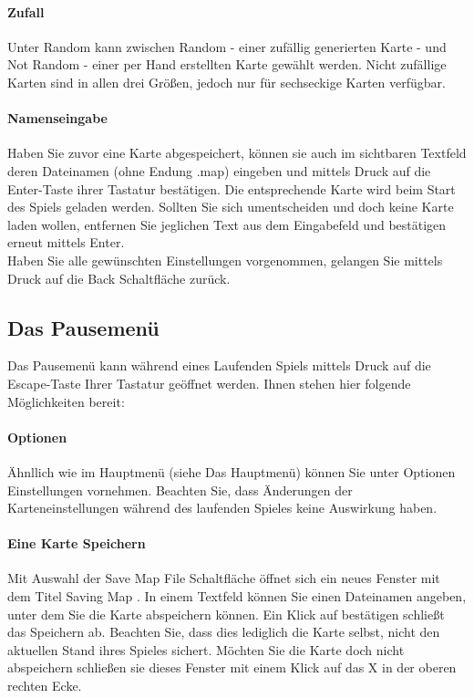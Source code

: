 \documentclass[a4paper,12pt]{scrartcl}
\begin{document}
	\paragraph{Zufall}
	Unter \glqq Random\grqq\hspace{0.05em} kann zwischen \glqq Random\grqq\hspace{0.05em}  - einer zufällig generierten Karte - und \glqq Not Random\grqq\hspace{0.05em}  - einer per Hand erstellten Karte gewählt werden.
	Nicht zufällige Karten sind in allen drei Größen, jedoch nur für sechseckige Karten verfügbar.
	
	\paragraph{Namenseingabe}
	Haben Sie zuvor eine Karte abgespeichert, können sie auch im sichtbaren Textfeld deren Dateinamen (ohne Endung .map) eingeben und mittels Druck auf die Enter-Taste ihrer Tastatur bestätigen. Die entsprechende Karte wird beim Start des Spiels geladen werden.
	Sollten Sie sich umentscheiden und doch keine Karte laden wollen, entfernen Sie jeglichen Text aus dem Eingabefeld und bestätigen erneut mittels Enter.\\
	Haben Sie alle gewünschten Einstellungen vorgenommen, gelangen Sie mittels Druck auf die \glqq Back\grqq\hspace{0.05em}  Schaltfläche zurück.
	
	\subsection{Das Pausemenü}
	Das Pausemenü kann während eines Laufenden Spiels mittels Druck auf die Escape-Taste Ihrer Tastatur geöffnet werden.
	Ihnen stehen hier folgende Möglichkeiten bereit:
	
	\paragraph{Optionen}
	Ähnllich wie im Hauptmenü (siehe \glqq Das Hauptmenü\grqq) können Sie unter \glqq Optionen\grqq\hspace{0.05em} Einstellungen vornehmen.
	Beachten Sie, dass Änderungen der Karteneinstellungen während des laufenden Spieles keine Auswirkung haben.
	
	\paragraph{Eine Karte Speichern}
	Mit Auswahl der \glqq Save Map File\grqq\hspace{0.05em} Schaltfläche öffnet sich ein neues Fenster mit dem Titel \glqq Saving Map\grqq\hspace{0.05em} .
	In einem Textfeld können Sie einen Dateinamen angeben, unter dem Sie die Karte abspeichern können. 
	Ein Klick auf bestätigen schließt das Speichern ab.
	Beachten Sie, dass dies lediglich die Karte selbst, nicht den aktuellen Stand ihres Spieles sichert.
	Möchten Sie die Karte doch nicht abspeichern schließen sie dieses Fenster mit einem Klick auf das \glqq X\grqq\hspace{0.05em}  in der oberen rechten Ecke.
	
\end{document}
